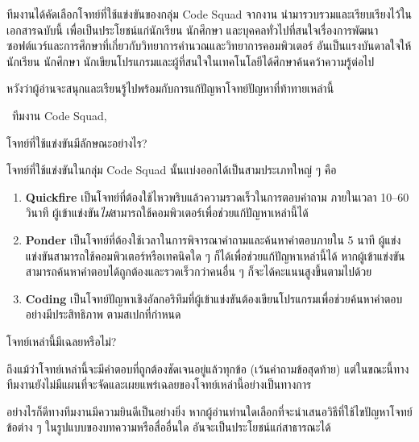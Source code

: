 ทีมงานได้คัดเลือกโจทย์ที่ใช้แข่งขันของกลุ่ม Code Squad จากงาน {\techjam} นำมารวบรวมและเรียบเรียงไว้ในเอกสารฉบับนี้ 
เพื่อเป็นประโยชน์แก่นักเรียน นักศึกษา และบุคคลทั่วไปที่สนใจเรื่องการพัฒนาซอฟต์แวร์และการศึกษาที่เกี่ยวกับวิทยาการคำนวณและวิทยาการคอมพิวเตอร์ 
อันเป็นแรงบันดาลใจให้นักเรียน นักศึกษา นักเขียนโปรแกรมและผู้ที่สนใจในเทคโนโลยีได้ศึกษาค้นคว้าความรู้ต่อไป

หวังว่าผู้อ่านจะสนุกและเรียนรู้ไปพร้อมกับการแก้ปัญหาโจทย์ปัญหาที่ท้าทายเหล่านี้

\begin{flushright}
\twoemrule\ ทีมงาน Code Squad, {\techjam}
\end{flushright}


\newpage\noindent
{\sectionfont \llap{$\blacklozenge$\; }โจทย์ที่ใช้แข่งขันมีลักษณะอย่างไร?}

\smallskip\noindent
โจทย์ที่ใช้แข่งขันในกลุ่ม Code Squad นั้นแบ่งออกได้เป็นสามประเภทใหญ่ ๆ คือ

\begin{enumerate}
    \item \textbf{Quickfire}\; 
        เป็นโจทย์ที่ต้องใช้ไหวพริบแล้วความรวดเร็วในการตอบคำถาม ภายในเวลา 10{\hrsp--\hrsp}60 วินาที\;
        ผู้เข้าแข่งขัน\textit{ไม่}สามารถใช้คอมพิวเตอร์เพื่อช่วยแก้ปัญหาเหล่านี้ได้ 
    \item \textbf{Ponder}\;
        เป็นโจทย์ที่ต้องใช้เวลาในการพิจารณาคำถามและค้นหาคำตอบภายใน 5 นาที\;
        ผู้แข่งแข่งขันสามารถใช้คอมพิวเตอร์หรือเทคนิคใด ๆ ก็ได้เพื่อช่วยแก้ปัญหาเหล่านี้ได้\;
        หากผู้เข้าแข่งขันสามารถค้นหาคำตอบได้ถูกต้องและรวดเร็วกว่าคนอื่น ๆ ก็จะได้คะแนนสูงขึ้นตามไปด้วย
    \item \textbf{Coding}\;
        เป็นโจทย์ปัญหาเชิงอัลกอริทึมที่ผู้เข้าแข่งขันต้องเขียนโปรแกรมเพื่อช่วยค้นหาคำตอบอย่างมีประสิทธิภาพ
        ตามสเปกที่กำหนด
\end{enumerate}

\medskip\noindent
{\sectionfont \llap{$\blacklozenge$\; }โจทย์เหล่านี้มีเฉลยหรือไม่?}

\smallskip\noindent
ถึงแม้ว่าโจทย์เหล่านี้จะมีคำตอบที่ถูกต้องชัดเจนอยู่แล้วทุกข้อ (เว้นคำถามข้อสุดท้าย)
แต่ในขณะนี้ทางทีมงานยังไม่มีแผนที่จะจัดและเผยแพร่เฉลยของโจทย์เหล่านี้อย่างเป็นทางการ

อย่างไรก็ดีทางทีมงานมีความยินดีเป็นอย่างยิ่ง หากผู้อ่านท่านใดเลือกที่จะนำเสนอวิธีที่ใช้ไขปัญหาโจทย์ข้อต่าง ๆ
ในรูปแบบของบทความหรือสื่ออื่นใด อันจะเป็นประโยชน์แก่สาธารณะได้


\vspace*{\fill}

